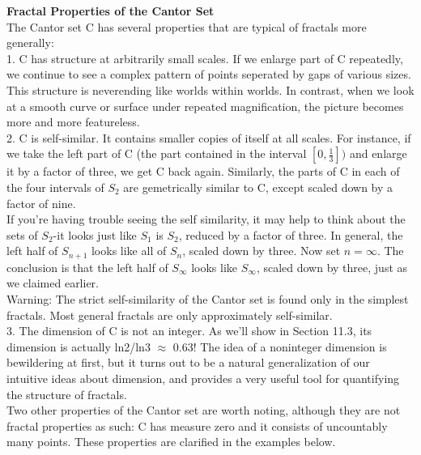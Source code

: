 \documentclass{article}
\newcommand\tab[1][1cm]{\hspace*{#1}}
\begin{document}
\textbf {Fractal Properties of the Cantor Set} \\

The Cantor set C has several properties that are typical of fractals more generally: \\ \tab \tab
1. C has structure at arbitrarily small scales. If we enlarge part of C repeatedly, we continue to see a complex pattern of points seperated by gaps of various sizes. This structure is neverending like worlds within worlds. In contrast, when we look at a smooth curve or surface under repeated magnification, the picture becomes more and more featureless. \\ \tab \tab
2. C is self-similar. It contains smaller copies of itself at all scales. For instance, if we take the left part of C (the part contained in the interval $[0, \frac{1}{3}])$ and enlarge it by a factor of three, we get C back again. Similarly, the parts of C in each of the four intervals of $S_{2}$ are gemetrically similar to C, except scaled down by a factor of nine. \\ \tab \tab \tab
If you're having trouble seeing the self similarity, it may help to think about the sets of $S_{2}$-it looks just like $S_{1}$ is $S_{2}$, reduced by a factor of three. In general, the left half of $S_{n+1}$ looks like all of $S_{n}$, scaled down by three. Now set $n=\infty$. The conclusion is that the left half of $S_{\infty}$ looks like $S_{\infty}$, scaled down by three, just as we claimed earlier. \\ \tab \tab \tab
Warning: The strict self-similarity of the Cantor set is found only in the simplest fractals. Most general fractals are only approximately self-similar. \\ \tab \tab 
3. The dimension of C is not an integer. As we'll show in Section 11.3, its dimension is actually ln2/ln3 $\approx$ 0.63! The idea of a noninteger dimension is bewildering at first, but it turns out to be a natural generalization of our intuitive ideas about dimension, and provides a very useful tool for quantifying the structure of fractals. \\
\tab
Two other properties of the Cantor set are worth noting, although they are not fractal properties as such: C has measure zero and it consists of uncountably many points. These properties are clarified in the examples below. \\
\end{document}
